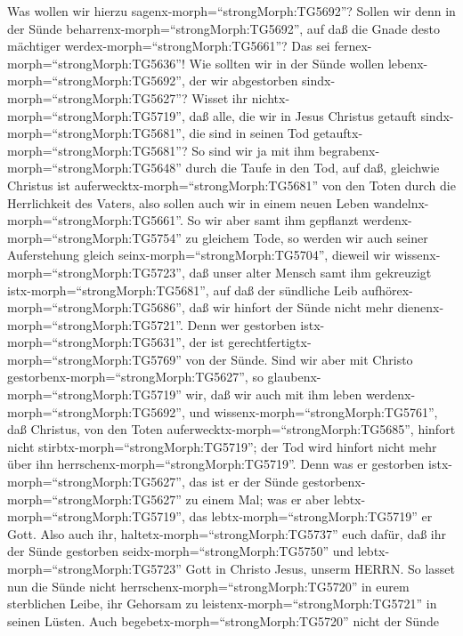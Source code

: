  Was wollen wir hierzu sagenx-morph=``strongMorph:TG5692''?
Sollen wir denn in der Sünde beharrenx-morph=``strongMorph:TG5692'', auf
daß die Gnade desto mächtiger werdex-morph=``strongMorph:TG5661''?
 Das sei fernex-morph=``strongMorph:TG5636''! Wie sollten
wir in der Sünde wollen lebenx-morph=``strongMorph:TG5692'', der wir
abgestorben sindx-morph=``strongMorph:TG5627''?  Wisset ihr
nichtx-morph=``strongMorph:TG5719'', daß alle, die wir in Jesus Christus
getauft sindx-morph=``strongMorph:TG5681'', die sind in seinen Tod
getauftx-morph=``strongMorph:TG5681''?  So sind wir ja mit
ihm begrabenx-morph=``strongMorph:TG5648'' durch die Taufe in den Tod,
auf daß, gleichwie Christus ist auferwecktx-morph=``strongMorph:TG5681''
von den Toten durch die Herrlichkeit des Vaters, also sollen auch wir in
einem neuen Leben wandelnx-morph=``strongMorph:TG5661''.  So
wir aber samt ihm gepflanzt werdenx-morph=``strongMorph:TG5754'' zu
gleichem Tode, so werden wir auch seiner Auferstehung gleich
seinx-morph=``strongMorph:TG5704'',  dieweil wir
wissenx-morph=``strongMorph:TG5723'', daß unser alter Mensch samt ihm
gekreuzigt istx-morph=``strongMorph:TG5681'', auf daß der sündliche Leib
aufhörex-morph=``strongMorph:TG5686'', daß wir hinfort der Sünde nicht
mehr dienenx-morph=``strongMorph:TG5721''.  Denn wer
gestorben istx-morph=``strongMorph:TG5631'', der ist
gerechtfertigtx-morph=``strongMorph:TG5769'' von der Sünde. 
Sind wir aber mit Christo gestorbenx-morph=``strongMorph:TG5627'', so
glaubenx-morph=``strongMorph:TG5719'' wir, daß wir auch mit ihm leben
werdenx-morph=``strongMorph:TG5692'',  und
wissenx-morph=``strongMorph:TG5761'', daß Christus, von den Toten
auferwecktx-morph=``strongMorph:TG5685'', hinfort nicht
stirbtx-morph=``strongMorph:TG5719''; der Tod wird hinfort nicht mehr
über ihn herrschenx-morph=``strongMorph:TG5719''.  Denn was
er gestorben istx-morph=``strongMorph:TG5627'', das ist er der Sünde
gestorbenx-morph=``strongMorph:TG5627'' zu einem Mal; was er aber
lebtx-morph=``strongMorph:TG5719'', das
lebtx-morph=``strongMorph:TG5719'' er Gott.  Also auch ihr,
haltetx-morph=``strongMorph:TG5737'' euch dafür, daß ihr der Sünde
gestorben seidx-morph=``strongMorph:TG5750'' und
lebtx-morph=``strongMorph:TG5723'' Gott in Christo Jesus, unserm HERRN.
 So lasset nun die Sünde nicht
herrschenx-morph=``strongMorph:TG5720'' in eurem sterblichen Leibe, ihr
Gehorsam zu leistenx-morph=``strongMorph:TG5721'' in seinen Lüsten.
 Auch begebetx-morph=``strongMorph:TG5720'' nicht der Sünde
